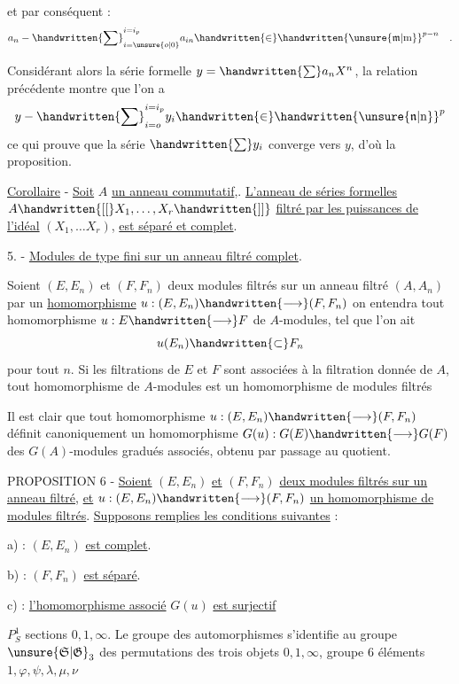 et par conséquent :
\[
a_n-\handwritten{\sum}_{i=\unsure{o|0}}^{i=i_p}a_{in}\handwritten{\in}\handwritten{\unsure{\mathfrak{m}|\mathrm{m}}}^{p-n}\quad.
\]

Considérant alors la série formelle $y=\handwritten{\sum} a_n X^n$, la relation précédente montre que l'on a
\[
y-\handwritten{\sum}_{i=o}^{i=i_p}y_i\handwritten{\in}\handwritten{\unsure{\mathfrak{n}|\mathrm{n}}}^p
\]
ce qui prouve que la série $\handwritten{\sum} y_i$ converge vers $y$, d'où la proposition.

\uline{Corollaire} - \uline{Soit} $A$ \uline{un anneau commutatif},. \uline{L'anneau de séries formelles} $A\handwritten{[[}X_1,\ldots,X_r\handwritten{]]}$ \uline{filtré par les puissances de l'idéal} $(X_1,\ldots X_r)$, \uline{est séparé et complet}.

5. - \uline{Modules de type fini sur un anneau filtré complet}.

Soient $(E,E_n)$ et $(F,F_n)$ deux modules filtrés sur un anneau filtré $(A,A_n)$ par un \uline{homomorphisme} $u:(E,E_n)\handwritten{\longrightarrow}(F,F_n)$ on entendra tout homomorphisme $u:E\handwritten{\longrightarrow} F$ de $A$-modules, tel que l'on ait
\[
u(E_n)\handwritten{\subset} F_n
\]
pour tout $n$. Si les filtrations de $E$ et $F$ sont associées à la filtration donnée de $A$, tout homomorphisme de $A$-modules est un homomorphisme de modules filtrés

Il est clair que tout homomorphisme $u:(E,E_n)\handwritten{\longrightarrow}(F,F_n)$ définit canoniquement un homomorphisme $G(u):G(E)\handwritten{\longrightarrow} G(F)$ des $G(A)$-modules gradués associés, obtenu par passage au quotient.

PROPOSITION 6 - \uline{Soient} $(E,E_n)$ \uline{et} $(F,F_n)$ \uline{deux modules filtrés sur un anneau filtré}, \uline{et} $u:(E,E_n)\handwritten{\longrightarrow}(F,F_n)$ \uline{un homomorphisme de modules filtrés}. \uline{Supposons remplies les conditions suivantes} :

a) : $(E,E_n)$ \uline{est complet}.

b) : $(F,F_n)$ \uline{est séparé}.

c) : \uline{l'homomorphisme associé} $G(u)$ \uline{est surjectif}

$P^1_S$ sections $0,1,\infty$. Le groupe des automorphismes s'identifie au groupe $\unsure{\mathfrak{S}|\mathfrak{G}}_3$ des permutations des trois objets $0,1,\infty$, groupe  6 éléments $1,\varphi,\psi,\lambda,\mu,\nu$

